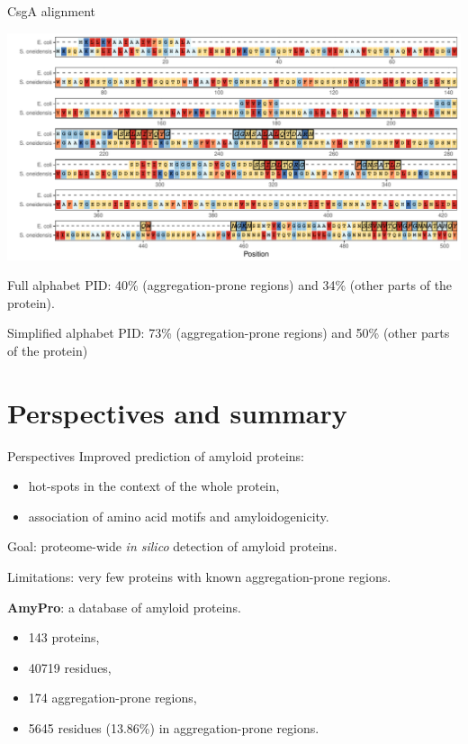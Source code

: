 \documentclass{beamer}\usepackage[]{graphicx}\usepackage[]{color}
\makeatletter
\def\maxwidth{ %
  \ifdim\Gin@nat@width>\linewidth
    \linewidth
  \else
    \Gin@nat@width
  \fi
}
\newenvironment{knitrout}{}{} %
\makeatother
\begin{document}
\begin{frame}{CsgA alignment}

\begin{knitrout}
\color{fgcolor}

{\centering \includegraphics[width=\maxwidth]{figure/unnamed-chunk-21-1} 

}



\end{knitrout}
Full alphabet PID: 40\% (aggregation-prone regions) and 34\% (other parts of the protein). 

Simplified alphabet PID: 73\% (aggregation-prone regions) and 50\% (other parts of the protein)
\end{frame}


\section{Perspectives and summary}

\begin{frame}{Perspectives}
Improved prediction of amyloid proteins:
\begin{itemize}
\item hot-spots in the context of the whole protein,
\item association of amino acid motifs and amyloidogenicity.
\end{itemize}

Goal: proteome-wide \textit{in silico} detection of amyloid proteins.

Limitations: very few proteins with known aggregation-prone regions.

\textbf{AmyPro}: a database of amyloid proteins.

\begin{itemize}
 \item 143 proteins,
 \item 40719 residues,
 \item 174 aggregation-prone regions,
 \item 5645 residues (13.86\%) in aggregation-prone regions.
\end{itemize}

\end{frame}  
\end{document}
